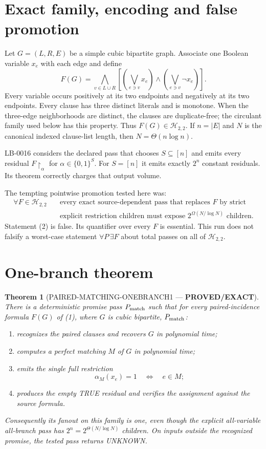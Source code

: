 \documentclass[11pt]{article}
\newcommand{\Htwo}{\mathcal H_{2,2}}
\newcommand{\EXACT}{\textbf{PROVED/EXACT}}
\newtheorem{theorem}{Theorem}
\begin{document}
\section{Exact family, encoding and false promotion}

Let $G=(L,R,E)$ be a simple cubic bipartite graph.  Associate one Boolean
variable $x_e$ with each edge and define
\[
 F(G)=\bigwedge_{v\in L\cup R}
 \left[
   \left(\bigvee_{e\ni v}x_e\right)
   \wedge
   \left(\bigvee_{e\ni v}\neg x_e\right)
 \right].
 \tag{1}
\]
Every variable occurs positively at its two endpoints and negatively at its
two endpoints.  Every clause has three distinct literals and is monotone.
When the three-edge neighborhoods are distinct, the clauses are
duplicate-free; the circulant family used below has this property.  Thus
$F(G)\in\Htwo$.  If $n=|E|$ and $N$ is the canonical indexed clause-list
length, then $N=\Theta(n\log n)$.

LB-0016 considers the declared pass that chooses $S\subseteq[n]$ and emits
every residual $F\upharpoonright_\alpha$ for
$\alpha\in\{0,1\}^{S}$.  For $S=[n]$ it emits exactly $2^n$ constant
residuals.  Its theorem correctly charges that output volume.

The tempting pointwise promotion tested here was:
\[
 \begin{aligned}
 \forall F\in\Htwo\quad
 &\text{every exact source-dependent pass that replaces $F$ by strict}\\
 &\text{explicit restriction children must expose
 $2^{\Omega(N/\log N)}$ children.}
 \end{aligned}
 \tag{2}
\]
Statement (2) is false.  Its quantifier over every $F$ is essential.  This
run does not falsify a worst-case statement
$\forall P\,\exists F$ about total passes on all of $\Htwo$.

\section{One-branch theorem}

\begin{theorem}[PAIRED-MATCHING-ONEBRANCH1 --- \EXACT]
There is a deterministic promise pass $P_{\rm match}$ such that for every
paired-incidence formula $F(G)$ of (1), where $G$ is cubic bipartite,
$P_{\rm match}$:
\begin{enumerate}[leftmargin=1.6em]
\item recognizes the paired clauses and recovers $G$ in polynomial time;
\item computes a perfect matching $M$ of $G$ in polynomial time;
\item emits the single full restriction
\[
 \alpha_M(x_e)=1\quad\Longleftrightarrow\quad e\in M;
 \]
\item produces the empty TRUE residual and verifies the assignment against
the source formula.
\end{enumerate}
Consequently its fanout on this family is one, even though the explicit
all-variable all-branch pass has $2^n=2^{\Theta(N/\log N)}$ children.
On inputs outside the recognized promise, the tested pass returns UNKNOWN.
\end{theorem}
\end{document}
